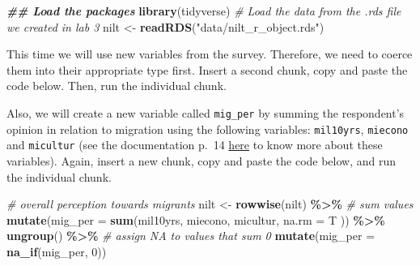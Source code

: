 \documentclass[
]{book}
\newenvironment{Shaded}{\begin{snugshade}}{\end{snugshade}}
\newcommand{\AttributeTok}[1]{\textcolor[rgb]{0.13,0.29,0.53}{#1}}
\newcommand{\CommentTok}[1]{\textcolor[rgb]{0.56,0.35,0.01}{\textit{#1}}}
\newcommand{\DecValTok}[1]{\textcolor[rgb]{0.00,0.00,0.81}{#1}}
\newcommand{\DocumentationTok}[1]{\textcolor[rgb]{0.56,0.35,0.01}{\textbf{\textit{#1}}}}
\newcommand{\FunctionTok}[1]{\textcolor[rgb]{0.13,0.29,0.53}{\textbf{#1}}}
\newcommand{\NormalTok}[1]{#1}
\newcommand{\OtherTok}[1]{\textcolor[rgb]{0.56,0.35,0.01}{#1}}
\newcommand{\SpecialCharTok}[1]{\textcolor[rgb]{0.81,0.36,0.00}{\textbf{#1}}}
\newcommand{\StringTok}[1]{\textcolor[rgb]{0.31,0.60,0.02}{#1}}
\begin{document}
\begin{Shaded}
\begin{Highlighting}[]
\DocumentationTok{\#\# Load the packages}
\FunctionTok{library}\NormalTok{(tidyverse)}
\CommentTok{\# Load the data from the .rds file we created in lab 3}
\NormalTok{nilt }\OtherTok{\textless{}{-}} \FunctionTok{readRDS}\NormalTok{(}\StringTok{"data/nilt\_r\_object.rds"}\NormalTok{)}
\end{Highlighting}
\end{Shaded}

This time we will use new variables from the survey. Therefore, we need to coerce them into their appropriate type first. Insert a second chunk, copy and paste the code below. Then, run the individual chunk.

\begin{Shaded}
\end{Shaded}

Also, we will create a new variable called \texttt{mig\_per} by summing the respondent's opinion in relation to migration using the following variables: \texttt{mil10yrs}, \texttt{miecono} and \texttt{micultur} (see the documentation p.~14 \href{https://www.ark.ac.uk/teaching/NILT2012TeachingResources.pdf}{here} to know more about these variables). Again, insert a new chunk, copy and paste the code below, and run the individual chunk.

\begin{Shaded}
\begin{Highlighting}[]
\CommentTok{\# overall perception towards migrants}
\NormalTok{nilt }\OtherTok{\textless{}{-}} \FunctionTok{rowwise}\NormalTok{(nilt) }\SpecialCharTok{\%\textgreater{}\%} 
  \CommentTok{\# sum values}
  \FunctionTok{mutate}\NormalTok{(}\AttributeTok{mig\_per =} \FunctionTok{sum}\NormalTok{(mil10yrs, miecono, micultur, }\AttributeTok{na.rm =}\NormalTok{ T )) }\SpecialCharTok{\%\textgreater{}\%} 
  \FunctionTok{ungroup}\NormalTok{() }\SpecialCharTok{\%\textgreater{}\%} 
  \CommentTok{\# assign NA to values that sum 0}
  \FunctionTok{mutate}\NormalTok{(}\AttributeTok{mig\_per =}  \FunctionTok{na\_if}\NormalTok{(mig\_per, }\DecValTok{0}\NormalTok{))}
\end{Highlighting}
\end{Shaded}
\end{document}
